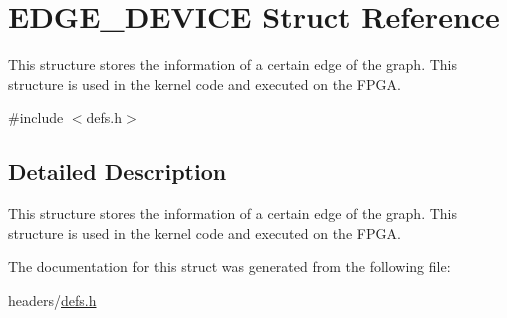 \hypertarget{structEDGE__DEVICE}{}\section{E\+D\+G\+E\+\_\+\+D\+E\+V\+I\+CE Struct Reference}
\label{structEDGE__DEVICE}


This structure stores the information of a certain edge of the graph. This structure is used in the kernel code and executed on the F\+P\+GA.  




{\ttfamily \#include $<$defs.\+h$>$}



\subsection{Detailed Description}
This structure stores the information of a certain edge of the graph. This structure is used in the kernel code and executed on the F\+P\+GA. 

The documentation for this struct was generated from the following file\+:\begin{DoxyCompactItemize}
\item 
headers/\hyperlink{defs_8h}{defs.\+h}\end{DoxyCompactItemize}
